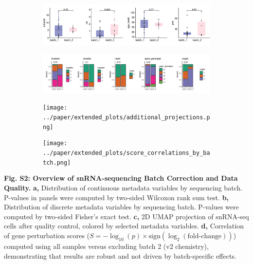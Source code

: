 \begin{figure}[H]
    \begin{subfigure}[t]{\textwidth}
        \caption{}
        \includegraphics[width=\textwidth]{../paper/extended_plots/seq_batch_cont.png}        
    \end{subfigure}
    \begin{subfigure}[t]{\textwidth}
        \caption{}
        \includegraphics[width=\textwidth]{../paper/extended_plots/seq_batch_cat.png}        
    \end{subfigure}  
    \begin{subfigure}[t]{\textwidth}
        \caption{}
        \texttt{[image: ../paper/extended\_plots/additional\_projections.png]}        
    \end{subfigure}   
    \begin{subfigure}[t]{\textwidth}
        \caption{}
        \texttt{[image: ../paper/extended\_plots/score\_correlations\_by\_batch.png]}        
    \end{subfigure}   
\end{figure}
\textbf{Fig. S2: Overview of snRNA-sequencing Batch Correction and Data Quality.}
\textbf{a,} Distribution of continuous metadata variables by sequencing batch. P-values in panels were computed by two-sided Wilcoxon rank sum test.
\textbf{b,} Distribution of discrete metadata variables by sequencing batch. P-values were computed by two-sided Fisher's exact test.
\textbf{c,} 2D UMAP projection of snRNA-seq cells after quality control, colored by selected metadata variables.
\textbf{d,} Correlation of gene perturbation scores ($S = -\log_{10}(p)\times\text{sign}(\log_2(\text{fold-change}))$) computed using all samples versus excluding batch 2 (v2 chemistry), demonstrating that results are robust and not driven by batch-specific effects.
